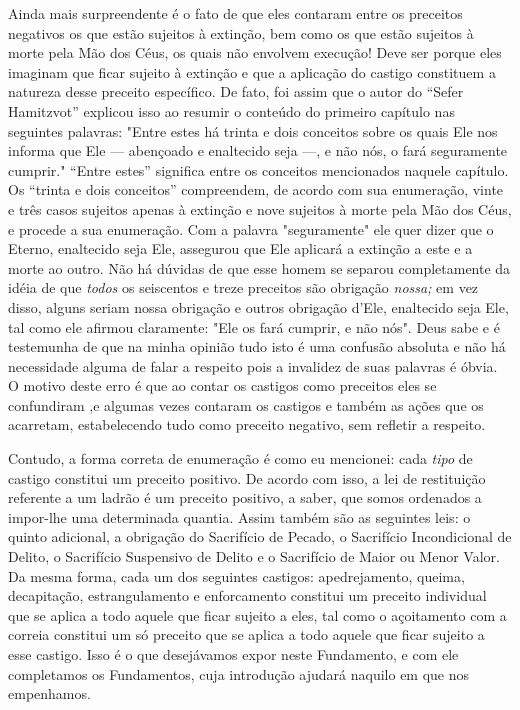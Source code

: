Ainda mais surpreendente é o fato de que eles contaram entre os
pre­ceitos negativos os que estão sujeitos à extinção, bem como os que
estão sujei­tos à morte pela Mão dos Céus, os quais não envolvem
execução! Deve ser por­que eles imaginam que ficar sujeito à extinção e
que a aplicação do castigo cons­tituem a natureza desse preceito
específico. De fato, foi assim que o autor do ``Sefer Hamitzvot'' explicou
isso ao resumir o conteúdo do primeiro capítulo nas seguintes palavras:
"Entre estes há trinta e dois conceitos sobre os quais Ele nos informa
que Ele --- abençoado e enaltecido seja ---, e não nós, o fará
seguramente cumprir." ``Entre estes'' significa entre os conceitos
mencionados naquele capítulo. Os ``trinta e dois conceitos'' compreendem,
de acordo com sua enumeração, vinte e três casos sujeitos apenas à
extinção e nove sujeitos à morte pela Mão dos Céus, e procede a sua
enumeração. Com a palavra "segu­ramente"
ele quer dizer que o Eterno, enaltecido seja Ele, assegurou que Ele
aplicará a extinção a este e a morte ao outro. Não há dúvidas de que
esse ho­mem se separou completamente da idéia de que \emph{todos} os
seiscentos e treze pre­ceitos são obrigação \emph{nossa;} em vez disso,
alguns seriam nossa obrigação e ou­tros obrigação d'Ele, enaltecido seja
Ele, tal como ele afirmou claramente: "Ele os fará cumprir, e não nós".
Deus sabe e é testemunha de que na minha opi­nião tudo isto é uma
confusão absoluta e não há necessidade alguma de falar a respeito pois a
invalidez de suas palavras é óbvia. O motivo deste erro é que ao contar
os castigos como preceitos eles se confundiram ,e algumas vezes
con­taram os castigos e também as ações que os acarretam, estabelecendo
tudo co­mo preceito negativo, sem refletir a respeito.

Contudo, a forma correta de enumeração é como eu mencionei: ca­da
\emph{tipo} de castigo constitui um preceito positivo. De acordo com
isso, a lei de restituição referente a um ladrão é um preceito positivo,
a saber, que somos ordenados a impor-lhe uma determinada quantia. Assim
também são as seguin­tes leis: o quinto adicional, a obrigação do
Sacrifício de Pecado, o Sacrifício
Incondicional de Delito, o Sacrifício Suspensivo de Delito e o
Sacrifício de Maior ou Menor Valor. Da mesma forma, cada um dos
seguintes castigos: apedreja­mento, queima, decapitação, estrangulamento
e enforcamento constitui um pre­ceito individual que se aplica a todo
aquele que ficar sujeito a eles, tal como o açoitamento com a correia
constitui um só preceito que se aplica a todo aquele que ficar sujeito a
esse castigo. Isso é o que desejávamos expor neste Funda­mento, e com
ele completamos os Fundamentos, cuja introdução ajudará na­quilo em que
nos empenhamos.

